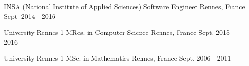 

\begin{cventries}

  \cventryfour
    {INSA (National Institute of Applied Sciences)} %
    {Software Engineer} %
    {Rennes, France} %
    {Sept. 2014 - 2016} %

  \cventryfour
    {University Rennes 1} %
    {MRes. in Computer Science} %
    {Rennes, France} %
    {Sept. 2015 - 2016} %

  \cventryfour
    {University Rennes 1} %
    {MSc. in Mathematics} %
    {Rennes, France} %
    {Sept. 2006 - 2011} %

%

\end{cventries}
